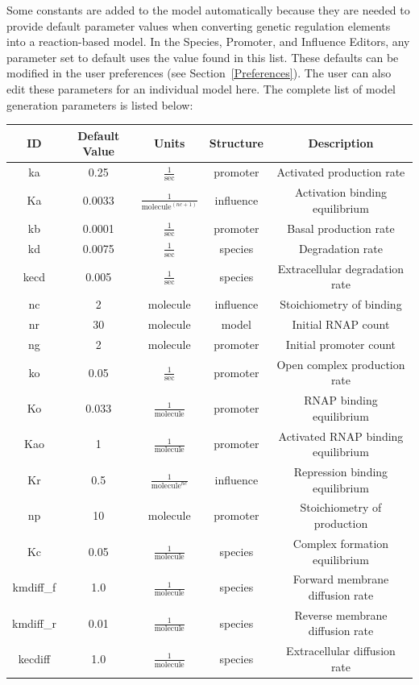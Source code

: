 \documentclass[titlepage,11pt]{article}
\begin{document}
\noindent
Some constants are added to the model automatically because they are needed to provide default parameter values when converting genetic regulation elements into a reaction-based model.  
In the Species, Promoter, and Influence Editors, any parameter set to default uses the value found in this list.  These defaults can be modified in the user preferences (see Section~\ref{Preferences}).  The user can also edit these parameters for an individual model here.  
The complete list of model generation parameters is listed below:

\begin{center}
\begin{tabular}{|c|c|c|c|c|}
\hline
ID & Default Value & Units      & Structure & Description \\ \hline \hline
ka & 0.25          & $\frac{1}{\mathrm{sec}}$ & promoter  
& Activated production rate\\ \hline 
Ka & 0.0033        & $\frac{1}{\mathrm{molecule}^{(nc+1)}}$ & influence
& Activation binding equilibrium \\ \hline
kb & 0.0001        & $\frac{1}{\mathrm{sec}}$ & promoter  
& Basal production rate \\ \hline
kd & 0.0075        & $\frac{1}{\mathrm{sec}}$ & species   
& Degradation rate \\ \hline
kecd & 0.005        & $\frac{1}{\mathrm{sec}}$ & species   
& Extracellular degradation rate \\ \hline
nc & 2             & molecule   & influence  & Stoichiometry of binding \\ \hline
nr & 30            & molecule   & model     & Initial RNAP count \\ \hline
ng & 2             & molecule   & promoter  & Initial promoter count \\ \hline
ko & 0.05          & $\frac{1}{\mathrm{sec}}$ & promoter  
& Open complex production rate \\ \hline
Ko & 0.033         & $\frac{1}{\mathrm{molecule}}$ & promoter  
& RNAP binding equilibrium\\ \hline
Kao & 1         & $\frac{1}{\mathrm{molecule}}$ & promoter  
& Activated RNAP binding equilibrium\\ \hline
Kr & 0.5           & $\frac{1}{\mathrm{molecule}^{nc}}$ & influence
& Repression binding equilibrium \\ \hline
np & 10            & molecule   & promoter  & Stoichiometry of
production \\ \hline
Kc & 0.05          & $\frac{1}{\mathrm{molecule}}$ & species
& Complex formation equilibrium \\ \hline
kmdiff\_f & 1.0          & $\frac{1}{\mathrm{molecule}}$ & species   
& Forward membrane diffusion rate\\ \hline
kmdiff\_r & 0.01          & $\frac{1}{\mathrm{molecule}}$ & species   
& Reverse membrane diffusion rate\\ \hline
kecdiff & 1.0          & $\frac{1}{\mathrm{molecule}}$ & species   
& Extracellular diffusion rate\\ \hline
\end{tabular}
\end{center}
\end{document}
